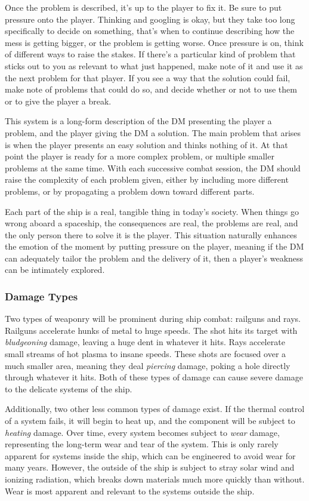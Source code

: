 \documentclass[a4paper]{article}
\begin{document}
Once the problem is described, it's up to the player to fix it. Be sure to put pressure onto the player. Thinking and googling is okay, but they take too long specifically to decide on something, that's when to continue describing how the mess is getting bigger, or the problem is getting worse. Once pressure is on, think of different ways to raise the stakes. If there's a particular kind of problem that sticks out to you as relevant to what just happened, make note of it and use it as the next problem for that player. If you see a way that the solution could fail, make note of problems that could do so, and decide whether or not to use them or to give the player a break.

This system is a long-form description of the DM presenting the player a problem, and the player giving the DM a solution. The main problem that arises is when the player presents an easy solution and thinks nothing of it. At that point the player is ready for a more complex problem, or multiple smaller problems at the same time. With each successive combat session, the DM should raise the complexity of each problem given, either by including more different problems, or by propagating a problem down toward different parts.

Each part of the ship is a real, tangible thing in today's society. When things go wrong aboard a spaceship, the consequences are real, the problems are real, and the only person there to solve it is the player. This situation naturally enhances the emotion of the moment by putting pressure on the player, meaning if the DM can adequately tailor the problem and the delivery of it, then a player's weakness can be intimately explored.

\subsubsection{Damage Types}

Two types of weaponry will be prominent during ship combat: railguns and rays. Railguns accelerate hunks of metal to huge speeds. The shot hits its target with \textit{bludgeoning} damage, leaving a huge dent in whatever it hits. Rays accelerate small streams of hot plasma to insane speeds. These shots are focused over a much smaller area, meaning they deal \textit{piercing} damage, poking a hole directly through whatever it hits. Both of these types of damage can cause severe damage to the delicate systems of the ship.

Additionally, two other less common types of damage exist. If the thermal control of a system fails, it will begin to heat up, and the component will be subject to \textit{heating} damage. Over time, every system becomes subject to \textit{wear} damage, representing the long-term wear and tear of the system. This is only rarely apparent for systems inside the ship, which can be engineered to avoid wear for many years. However, the outside of the ship is subject to stray solar wind and ionizing radiation, which breaks down materials much more quickly than without. Wear is most apparent and relevant to the systems outside the ship.
\end{document}
